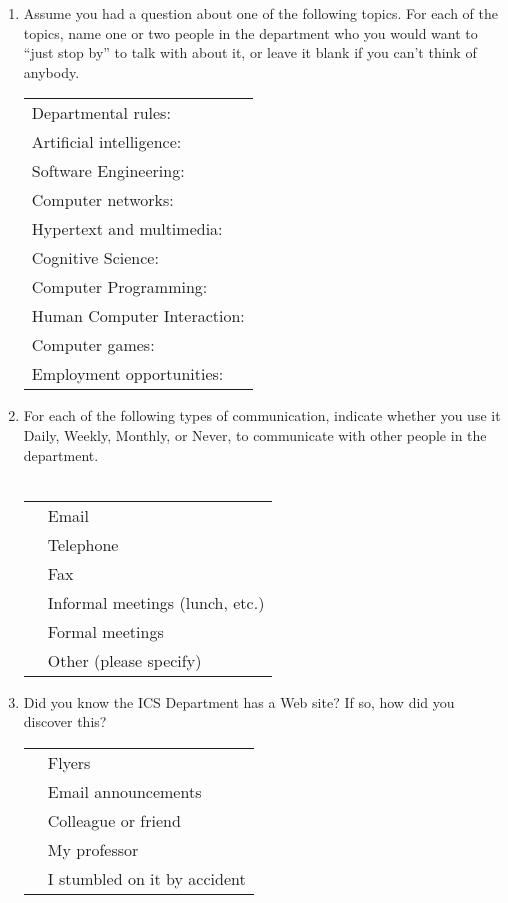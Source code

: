 \begin{enumerate}
\item{Assume you had a question about one of the following topics.  For
  each of the topics, name one or two people in the department who you
  would want to ``just stop by'' to talk with about it, or leave it blank
  if you can't think of anybody.}\\
  \begin{tabular}{l}
  Departmental rules: \\
  Artificial intelligence: \\
  Software Engineering: \\
  Computer networks: \\
  Hypertext and multimedia: \\
  Cognitive Science: \\
  Computer Programming: \\
  Human Computer Interaction: \\
  Computer games: \\
  Employment opportunities: \\
  \end{tabular}

\newpage
\item{For each of the following types of communication, indicate whether
  you use it Daily, Weekly, Monthly, or Never, to communicate with other
  people in the department.}\\
\\
  \begin{tabular}{ll}
    \underline{  }\underline{  }\underline{  }  & Email\\
    \underline{  }\underline{  }\underline{  }  & Telephone\\
    \underline{  }\underline{  }\underline{  }  & Fax\\
    \underline{  }\underline{  }\underline{  }  & Informal meetings (lunch, etc.)\\
    \underline{  }\underline{  }\underline{  }  & Formal meetings\\
    \underline{  }\underline{  }\underline{  }  & Other (please specify)\\
  \end{tabular}

\item{Did you know the ICS Department has a Web site? If so, how did you
  discover this?}\\
  \begin{tabular}{ll}
    \underline{  }\underline{  }\underline{  }  & Flyers\\
    \underline{  }\underline{  }\underline{  }  & Email announcements\\
    \underline{  }\underline{  }\underline{  }  & Colleague or friend\\
    \underline{  }\underline{  }\underline{  }  & My professor\\
    \underline{  }\underline{  }\underline{  }  & I stumbled on it by accident\\
  \end{tabular}


\end{enumerate}
